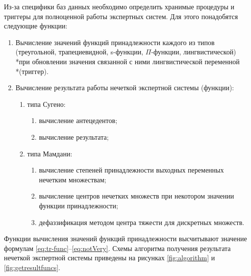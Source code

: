 Из-за специфики баз данных необходимо определить хранимые процедуры и триггеры для полноценной работы экспертных систем. Для этого понадобятся следующие функции:
\begin{enumerate}
	\item Вычисление значений функций принадлежности каждого из типов (треугольной, трапециевидной, s-функции, $\Pi$-функции, лингвистической) \\*при обновлении значения связанной с ними лингвистической переменной \\*(триггер).
	\item Вычисление результата работы нечеткой экспертной системы (функции):
	\begin{enumerate}
		\item типа Сугено:
		\begin{enumerate}
			\item вычисление антецедентов;
			\item вычисление результата;
		\end{enumerate}
		\item типа Мамдани:
		\begin{enumerate}
			\item вычисление степеней принадлежности выходных переменных нечетким множествам;
			\item вычисление центров нечетких множеств при некотором значении функции принадлежности;
			\item дефаззификация методом центра тяжести для дискретных множеств.
		\end{enumerate}
	\end{enumerate}
\end{enumerate}

Функции вычисления значений функций принадлежности высчитывают значение формулам \ref{eq:tr-func}--\ref{eq:notVery}. Схемы алгоритма получения результата нечеткой экспертной системы приведены на рисунках \ref{fig:algorithm} и \ref{fig:getresultfuncs}.

